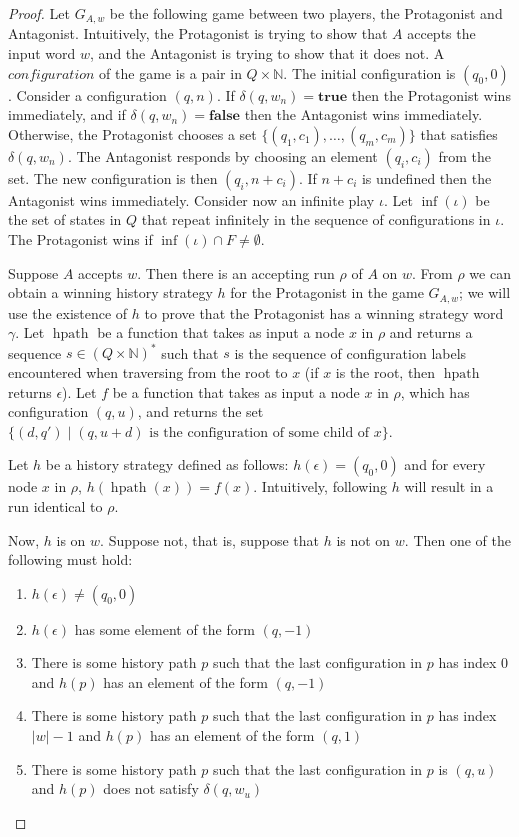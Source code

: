 \documentclass[10pt,a4paper]{amsart}
\theoremstyle{plain}
\theoremstyle{definition}
\theoremstyle{definition}
\DeclareMathOperator{\?}{?}
\DeclareMathOperator{\mypath}{hpath}
\begin{document}
\begin{proof}


    Let $G_{A,w}$ be the following game between two players, the Protagonist and Antagonist.
    Intuitively, the Protagonist is trying to show that $A$ accepts the input word $w$, and the Antagonist is trying
    to show that it does not. A $\textit{configuration}$ of the game is a pair in $Q \times \mathbb{N}$. The initial configuration is
    $(q_0, 0)$. Consider a configuration $(q,n)$. If $\delta(q,w_n) = \textbf{true}$ then the Protagonist wins immediately, and if
    $\delta(q,w_n) = \textbf{false}$ then the Antagonist wins immediately.
    Otherwise, the Protagonist chooses a set $\{(q_1,c_1), \ldots, (q_m,c_m)\}$ that
    satisfies $\delta(q, w_n)$. The Antagonist responds by choosing an element $(q_i, c_i)$ from the set. The new configuration is then
    $(q_i, n + c_i)$. If $n + c_i$ is undefined then the Antagonist wins immediately.
    Consider now an infinite play $\iota$. Let $\inf(\iota)$ be the set of states in $Q$ that repeat infinitely
    in the sequence of configurations in $\iota$. The Protagonist wins if $\inf(\iota) \cap F \neq \emptyset$.



    Suppose $A$ accepts $w$. Then there is an accepting run $\rho$ of $A$ on $w$. From $\rho$ we can obtain a winning history
    strategy $h$ for the Protagonist in the game $G_{A,w}$; we will use the existence of $h$ to prove that the Protagonist
    has a winning strategy word $\gamma$.
    Let $\mypath$ be a function that takes as input a node $x$ in $\rho$ and returns a sequence
    $s \in (Q \times \mathbb{N})^*$ such that $s$ is the sequence of configuration labels encountered when traversing from the
    root to $x$ (if $x$ is the root, then $\mypath$ returns $\epsilon$). Let $f$ be a function that takes as input
    a node $x$ in $\rho$, which has configuration $(q,u)$, and returns the set $\{(d,q') \mid (q, u+d) \text{ is the
    configuration of some child of } x \}$.

    Let $h$ be a history strategy defined as follows: $h(\epsilon) = (q_0,0)$ and for every node $x$ in $\rho$, $h(\mypath(x)) = f(x)$. Intuitively, following $h$ will result in a run identical to $\rho$.


    Now, $h$ is on $w$. Suppose not, that is, suppose that $h$ is not on $w$. Then one of the following must hold:
    \begin{enumerate}
        \item $h(\epsilon) \neq (q_0,0)$
        \item $h(\epsilon)$ has some element of the form $(q, -1)$
        \item There is some history path $p$ such that the last configuration in $p$ has index 0 and $h(p)$ has an element of the form $(q,-1)$
        \item There is some history path $p$ such that the last configuration in $p$ has index $|w| - 1$ and $h(p)$ has an element of the form $(q,1)$
        \item There is some history path $p$ such that the last configuration in $p$ is $(q,u)$ and $h(p)$ does not satisfy $\delta(q,w_u)$
    \end{enumerate}


\end{proof}
\end{document}
